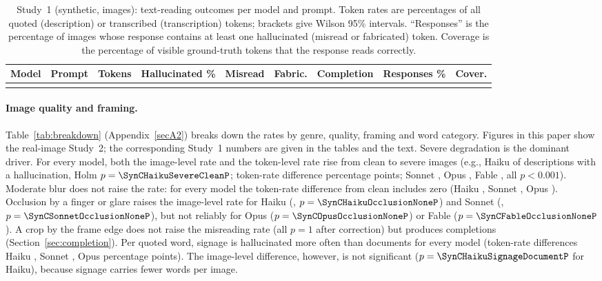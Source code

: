 \begin{table}[!tbp]
\caption{Study~1 (synthetic, \NImages{} images): text-reading outcomes per model and prompt. Token rates are percentages of all quoted (description) or transcribed (transcription) tokens; brackets give Wilson 95\% intervals. ``Responses'' is the percentage of images whose response contains at least one hallucinated (misread or fabricated) token. Coverage is the percentage of visible ground-truth tokens that the response reads correctly.}\label{tab:rates}
\footnotesize
\setlength{\tabcolsep}{3pt}
\begin{tabular*}{\textwidth}{@{\extracolsep\fill}llrlrrrlr}
\toprule
Model & Prompt & Tokens & Hallucinated \% & Misread & Fabric. & Completion & Responses \% & Cover. \\
\midrule
\botrule
\end{tabular*}
\end{table}

\paragraph{Image quality and framing.} Table~\ref{tab:breakdown} (Appendix~\ref{secA2}) breaks down the rates by genre, quality, framing and word category. Figures in this paper show the real-image Study~2; the corresponding Study~1 numbers are given in the tables and the text. Severe degradation is the dominant driver. For every model, both the image-level rate and the token-level rate rise from clean to severe images (e.g., Haiku \SynCHaikuSevereCleanImg{} of descriptions with a hallucination, Holm $p=\SynCHaikuSevereCleanP$; token-rate difference \SynCHaikuSevereCleanTok{} percentage points; Sonnet \SynCSonnetSevereCleanImg{}, Opus \SynCOpusSevereCleanImg{}, Fable \SynCFableSevereCleanImg{}, all $p<0.001$). Moderate blur does not raise the rate: for every model the token-rate difference from clean includes zero (Haiku \SynCHaikuBlurCleanTok, Sonnet \SynCSonnetBlurCleanTok, Opus \SynCOpusBlurCleanTok). Occlusion by a finger or glare raises the image-level rate for Haiku (\SynCHaikuOcclusionNoneImg, $p=\SynCHaikuOcclusionNoneP$) and Sonnet (\SynCSonnetOcclusionNoneImg, $p=\SynCSonnetOcclusionNoneP$), but not reliably for Opus ($p=\SynCOpusOcclusionNoneP$) or Fable ($p=\SynCFableOcclusionNoneP$). A crop by the frame edge does not raise the misreading rate (all $p=1$ after correction) but produces completions (Section~\ref{sec:completion}). Per quoted word, signage is hallucinated more often than documents for every model (token-rate differences Haiku \SynCHaikuSignageDocumentTok, Sonnet \SynCSonnetSignageDocumentTok, Opus \SynCOpusSignageDocumentTok{} percentage points). The image-level difference, however, is not significant ($p=\SynCHaikuSignageDocumentP$ for Haiku), because signage carries fewer words per image.

